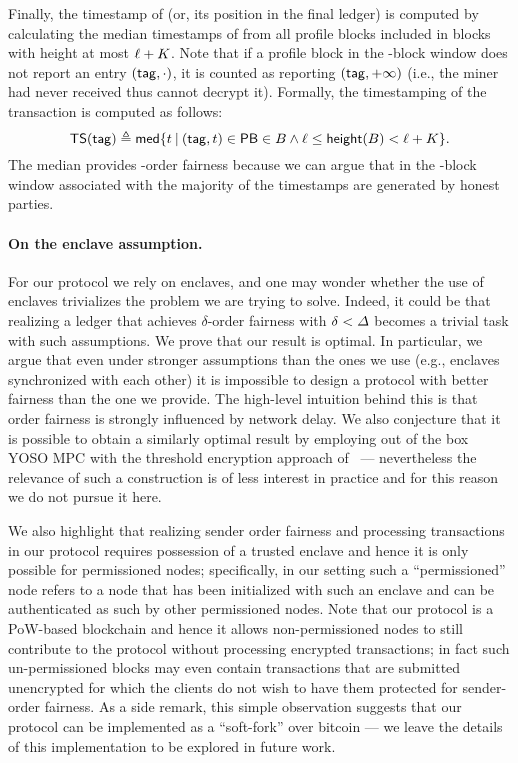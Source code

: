 Finally, the timestamp of \tx (or, its position in the final ledger) is computed by calculating the median timestamps of \txTag from all profile blocks included in blocks with height at most $\ell + K$.
%
Note that if a profile block in the \PBWindowLen-block window does not report an entry $(\mathsf{tag}, \cdot)$, it is counted as reporting $(\mathsf{tag}, +\infty)$ (i.e., the miner had never received \tx thus cannot decrypt it).
%
Formally, the timestamping of the transaction is computed as follows:
%
\[ \mathsf{TS}(\mathsf{tag}) \triangleq \mathsf{med} \{ t \mathbin|  (\mathsf{tag}, t) \in \mathsf{PB} \in B \wedge \ell \le \mathsf{height}(B) < \ell + K\}. \]
%
The median provides \delay-order fairness because we can argue that in the \PBWindowLen-block window associated with \txTag the majority of the timestamps are generated by honest parties.

\paragraph{On the enclave assumption.}
%
For our protocol we rely on enclaves, and one may wonder whether the use of enclaves trivializes the problem we are trying to solve.
%
Indeed, it could be that realizing a ledger that achieves $\delta$-order fairness with $\delta < \varDelta$ becomes a trivial task with such assumptions.
%
We prove that our result is optimal.
%
In particular, we argue that even under stronger assumptions than the ones we use (e.g., enclaves synchronized with each other) it is impossible to design a protocol with better fairness than the one we provide.
%
The high-level intuition behind this is that order fairness is strongly influenced by network delay.
%
We also conjecture that it is possible to obtain a similarly optimal result by employing out of the box YOSO MPC \cite{TCC:BGGHKL20} with the threshold encryption approach of~\cite{TOKENOMICS:MalSza23} --- nevertheless the relevance of such a construction is of less interest in practice and for this reason we do not pursue it here.

We also highlight that realizing sender order fairness and processing transactions in our protocol requires possession of a trusted enclave and hence it is only possible for permissioned nodes; specifically, in our setting such a ``permissioned'' node refers to a node that has been initialized with such an enclave and can be authenticated as such by other permissioned nodes.
%
Note that our protocol is a PoW-based blockchain and hence it allows non-permissioned nodes to still contribute to the protocol without processing encrypted transactions; in fact such un-permissioned blocks may even contain transactions that are submitted unencrypted for which the clients do not wish to have them protected for sender-order fairness.
%
As a side remark, this simple observation suggests that our protocol can be implemented as a ``soft-fork'' over bitcoin --- we leave the details of this implementation to be explored in future work.

